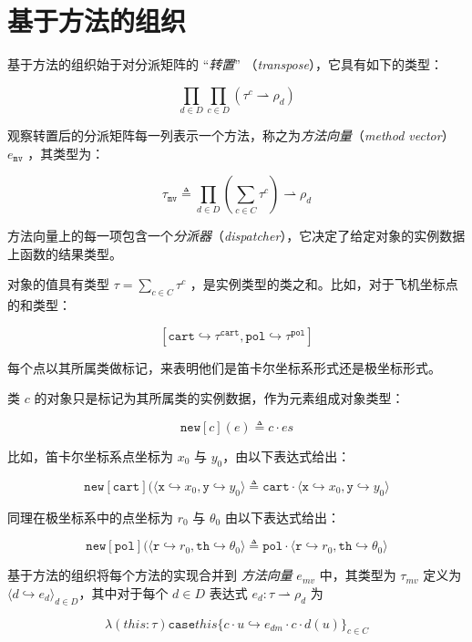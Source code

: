 \section{基于方法的组织}

基于方法的组织始于对分派矩阵的 “\textit{转置}” （\textit{transpose}），它具有如下的类型：

$$ \prod_{d \in D} \prod_{c \in D} (\tau^{c} \rightharpoonup \rho_{d}) $$

观察转置后的分派矩阵每一列表示一个方法，称之为\textit{方法向量}（\textit{method vector}）$e_{\mathtt{mv}}$ ，其类型为：

$$ \tau_{\mathtt{mv}} \triangleq \prod_{d \in D} (\sum_{c \in C} \tau^{c}) \rightharpoonup \rho_{d} $$

方法向量上的每一项包含一个\textit{分派器}（\textit{dispatcher}），它决定了给定对象的实例数据上函数的结果类型。

对象的值具有类型 $\tau = \sum_{c \in C} \tau^{c} $ ，是实例类型的类之和。比如，对于飞机坐标点的和类型：

$$ [{\mathtt{cart}} \hookrightarrow \tau^{\mathtt{cart}}, {\mathtt{pol}} \hookrightarrow \tau^{\mathtt{pol}}] $$

每个点以其所属类做标记，来表明他们是笛卡尔坐标系形式还是极坐标形式。

类 $c$ 的对象只是标记为其所属类的实例数据，作为元素组成对象类型：

$$ {\mathtt{new}}[c](e) \triangleq c \cdot es $$

比如，笛卡尔坐标系点坐标为 $x_{0}$ 与 $y_{0}$，由以下表达式给出：

$$ {\mathtt{new}}[{\mathtt{cart}}](\langle {\mathtt{x}} \hookrightarrow x_{0}, {\mathtt{y}} \hookrightarrow y_{0} \rangle \triangleq {\mathtt{cart}} \cdot \langle {\mathtt{x}} \hookrightarrow x_{0}, {\mathtt{y}} \hookrightarrow y_{0} \rangle $$

同理在极坐标系中的点坐标为 $r_{0}$ 与 $\theta_{0}$ 由以下表达式给出：

$$ {\mathtt{new}}[{\mathtt{pol}}](\langle {\mathtt{r}} \hookrightarrow r_{0}, {\mathtt{th}} \hookrightarrow \theta_{0} \rangle \triangleq {\mathtt{pol}} \cdot \langle {\mathtt{r}} \hookrightarrow r_{0}, {\mathtt{th}} \hookrightarrow \theta_{0} \rangle $$

基于方法的组织将每个方法的实现合并到 \textit{方法向量} $e_{mv}$ 中，其类型为 $\tau_{mv}$ 定义为 $\langle d \hookrightarrow e_{d} \rangle_{d \in D}$，其中对于每个 $d \in D$ 表达式 $ e_{d} : \tau \rightharpoonup \rho_{d}$ 为

$$ \lambda (this : \tau) {\mathtt{case}} this \{ c \cdot u \hookrightarrow e_{dm} \cdot c \cdot d(u) \}_{c \in C}$$

